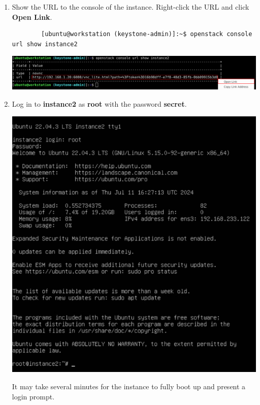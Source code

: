 \documentclass[letterpaper, 12pt]{article}
\begin{document}
\begin{enumerate}
    \item Show the URL to the console of the instance.
    Right-click the URL and click \textbf{Open Link}.
    \begin{lstlisting}
        [ubuntu@workstation (keystone-admin)]:~$ openstack console url show instance2
    \end{lstlisting}

    \begin{center}
        \includegraphics[width=\linewidth]{images/part2/step5.png}
    \end{center}

    \item Log in to \textbf{instance2} as \textbf{root} with the password \textbf{secret}.

    \begin{center}
        \includegraphics[width=\linewidth]{images/part2/step6.png}
    \end{center}

    \begin{notebox}
        It may take several minutes for the instance to fully boot up and present a login prompt.
    \end{notebox}


\end{enumerate}
\end{document}
